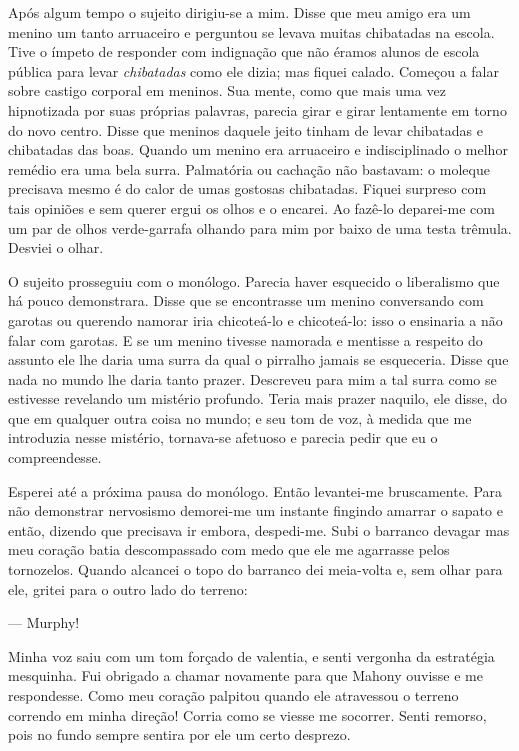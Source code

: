 Após algum tempo o sujeito dirigiu-se a mim.  Disse que meu amigo era um menino
um tanto arruaceiro e perguntou se levava muitas chibatadas na escola.  Tive o
ímpeto de responder com indignação que não éramos alunos de escola pública para
levar \textit{chibatadas} como ele dizia; mas fiquei calado.  Começou a falar
sobre castigo corporal em meninos.  Sua mente, como que mais uma vez
hipnotizada por suas próprias palavras, parecia girar e girar lentamente em
torno do novo centro.  Disse que meninos daquele jeito tinham de levar
chibatadas e chibatadas das boas.  Quando um menino era arruaceiro e
indisciplinado o melhor remédio era uma bela surra.  Palmatória ou cachação não
bastavam: o moleque precisava mesmo é do calor de umas gostosas chibatadas.
Fiquei surpreso com tais opiniões e sem querer ergui os olhos e o encarei.  Ao
fazê-lo deparei-me com um par de olhos verde-garrafa olhando para mim por baixo
de uma testa trêmula.  Desviei o olhar.

O sujeito prosseguiu com o monólogo.  Parecia haver esquecido o liberalismo que
há pouco demonstrara.  Disse que se encontrasse um menino conversando com
garotas ou querendo namorar iria chicoteá-lo e chicoteá-lo: isso o ensinaria a
não falar com garotas.  E se um menino tivesse namorada e mentisse a respeito
do assunto ele lhe daria uma surra da qual o pirralho jamais se esqueceria.
Disse que nada no mundo lhe daria tanto prazer.  Descreveu para mim a tal surra
como se estivesse revelando um mistério profundo.  Teria mais prazer naquilo,
ele disse, do que em qualquer outra coisa no mundo; e seu tom de voz, à medida
que me introduzia nesse mistério, tornava-se afetuoso e parecia pedir que eu o
compreendesse.

Esperei até a próxima pausa do monólogo.  Então levantei-me bruscamente.  Para
não demonstrar nervosismo demorei-me um instante fingindo amarrar o sapato e
então, dizendo que precisava ir embora, despedi-me.  Subi o barranco devagar
mas meu coração batia descompassado com medo que ele me agarrasse pelos
tornozelos.  Quando alcancei o topo do barranco dei meia-volta e, sem olhar
para ele, gritei para o outro lado do terreno:

--- Murphy!

Minha voz saiu com um tom forçado de valentia, e senti vergonha da estratégia
mesquinha.  Fui obrigado a chamar novamente para que Mahony ouvisse e me
respondesse.  Como meu coração palpitou quando ele atravessou o terreno
correndo em minha direção!  Corria como se viesse me socorrer.  Senti remorso,
pois no fundo sempre sentira por ele um certo desprezo.


